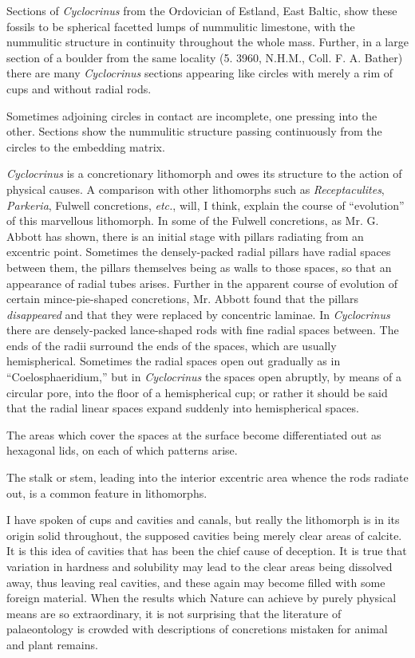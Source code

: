 \documentclass[a4paper, 12pt, oneside]{article}
\begin{document}
Sections of \emph{Cyclocrinus} from the Ordovician of Estland, East Baltic, show these fossils to be spherical facetted lumps of nummulitic limestone, with the nummulitic structure in continuity throughout the whole mass. Further, in a large section of a boulder from the same locality (5. 3960, N.H.M., Coll. F. A. Bather) there are many \emph{Cyclocrinus} sections appearing like circles with merely a rim of cups and without radial rods.

Sometimes adjoining circles in contact are incomplete, one pressing into the other. Sections show the nummulitic structure passing continuously from the circles to the embedding matrix.

\emph{Cyclocrinus} is a concretionary lithomorph and owes its structure to the action of physical causes. A comparison with other lithomorphs such as \emph{Receptaculites}, \emph{Parkeria}, Fulwell concretions, \emph{etc.}, will, I think, explain the course of ``evolution'' of this marvellous lithomorph. In some of the Fulwell concretions, as Mr. G. Abbott has shown, there is an initial stage with pillars radiating from an excentric point. Sometimes the densely-packed radial pillars have radial spaces between them, the pillars themselves being as walls to those spaces, so that an appearance of radial tubes arises. Further in the apparent course of evolution of certain mince-pie-shaped concretions, Mr. Abbott found that the pillars \emph{disappeared} and that they were replaced by concentric laminae. In \emph{Cyclocrinus} there are densely-packed lance-shaped rods with fine radial spaces between. The ends of the radii surround the ends of the spaces, which are usually hemispherical. Sometimes the radial spaces open out gradually as in ``Coelosphaeridium,'' but in \emph{Cyclocrinus} the spaces open abruptly, by means of a circular pore, into the floor of a hemispherical cup; or rather it should be said that the radial linear spaces expand suddenly into hemispherical spaces.

The areas which cover the spaces at the surface become differentiated out as hexagonal lids, on each of which patterns arise.

The stalk or stem, leading into the interior excentric area whence the rods radiate out, is a common feature in lithomorphs.

I have spoken of cups and cavities and canals, but really the lithomorph is in its origin solid throughout, the supposed cavities being merely clear areas of calcite. It is this idea of cavities that has been the chief cause of deception. It is true that variation in hardness and solubility may lead to the clear areas being dissolved away, thus leaving real cavities, and these again may become filled with some foreign material. When the results which Nature can achieve by purely physical means are so extraordinary, it is not surprising that the literature of palaeontology is crowded with descriptions of concretions mistaken for animal and plant remains.
\end{document}
